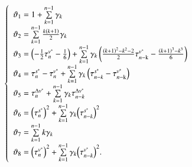 \documentclass[journal]{IEEEtran}
\begin{document}
\begin{equation}
  \left\{ \begin{array}{l}
    {\vartheta _1} = 1 + \sum\limits_{k = 1}^{n - 1} {{\gamma _k}}                                                                                                                                                                                                                \\
    {\vartheta _2} = \sum\limits_{k = 1}^{n - 1} {\frac{{k\left( {k + 1} \right)}}{2}{\gamma _k}}                                                                                                                                                                                 \\
    {\vartheta _3} = \left( { - \frac{1}{2}\tau _n^{{v^*}} - \frac{1}{6}} \right) + \sum\limits_{k = 1}^{n - 1} {{\gamma _k}\left( {\frac{{{{\left( {k + 1} \right)}^2} - {k^2} - 2}}{2}\tau _{n - {\rm{k}}}^{{v^*}} - \frac{{{{\left( {k + 1} \right)}^3} - {k^3}}}{6}} \right)} \\
    {\vartheta _4} = \tau _n^{{s^*}} - \tau _n^{{v^*}} + \sum\limits_{k = 1}^{n - 1} {{\gamma _k}\left( {\tau _{n - k}^{{s^*}} - \tau _{n - {\rm{k}}}^{{v^*}}} \right)}                                                                                                           \\
    {\vartheta _5} = \tau _n^{\Delta {v^*}} + \sum\limits_{k = 1}^{n - 1} {{\gamma _k}\tau _{n - k}^{\Delta {v^*}}}                                                                                                                                                               \\
    {\vartheta _6} = {\left( {\tau _n^{{s^*}}} \right)^2} + \sum\limits_{k = 1}^{n - 1} {{\gamma _k}{{\left( {\tau _{n - k}^{{s^*}}} \right)}^2}}                                                                                                                                 \\
    {\vartheta _7} = \sum\limits_{k = 1}^{n - 1} {k{\gamma _k}}                                                                                                                                                                                                                   \\
    {\vartheta _8} = {\left( {\tau _n^{{v^*}}} \right)^2} + \sum\limits_{k = 1}^{n - 1} {{\gamma _k}{{\left( {\tau _{n - k}^{{v^*}}} \right)}^2}}.
  \end{array} \right.
\end{equation}
\end{document}
